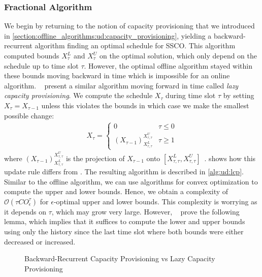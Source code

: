 \subsubsection{Fractional Algorithm}

We begin by returning to the notion of capacity provisioning that we introduced in \cref{section:offline_algorithms:ud:capacity_provisioning}, yielding a backward-recurrent algorithm finding an optimal schedule for SSCO. This algorithm computed bounds $X_{\tau}^L$ and $X_{\tau}^U$ on the optimal solution, which only depend on the schedule up to time slot $\tau$. However, the optimal offline algorithm stayed within these bounds moving backward in time which is impossible for an online algorithm. \citeauthor*{Lin2011}~\cite{Lin2011} present a similar algorithm moving forward in time called \emph{lazy capacity provisioning}. We compute the schedule $X_{\tau}$ during time slot $\tau$ by setting $X_{\tau} = X_{\tau-1}$ unless this violates the bounds in which case we make the smallest possible change: \begin{align*}
    X_{\tau} = \begin{cases}
        0 & \tau \leq 0 \\
        (X_{\tau-1})_{X_{\tau,\tau}^L}^{X_{\tau,\tau}^U} & \tau \geq 1
    \end{cases}
\end{align*} where $(X_{\tau-1})_{X_{\tau,\tau}^L}^{X_{\tau,\tau}^U}$ is the projection of $X_{\tau-1}$ onto $[X_{\tau,\tau}^L, X_{\tau,\tau}^U]$~\cite{Lin2011}.  shows how this update rule differs from . The resulting algorithm is described in \cref{alg:ud:lcp}. Similar to the offline algorithm, we can use algorithms for convex optimization to compute the upper and lower bounds. Hence, we obtain a complexity of $\mathcal{O}(\tau C O_{\epsilon}^{\tau})$ for $\epsilon$-optimal upper and lower bounds. This complexity is worrying as it depends on $\tau$, which may grow very large. However, \citeauthor*{Lin2011}~\cite{Lin2011} prove the following lemma, which implies that it suffices to compute the lower and upper bounds using only the history since the last time slot where both bounds were either decreased or increased.

\begin{figure}
    \centering
    [TODO]

    \caption{Backward-Recurrent Capacity Provisioning vs Lazy Capacity Provisioning}
    \label{fig:backward_recurrent_capacity_provisioing_vs_lazy_capacity_provisioning}
\end{figure}

